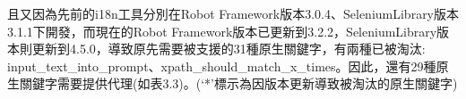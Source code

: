 \begin{table}[H]
    \centering
    \caption{第一版i18n已提供代理的Robot Framework原生關鍵字}
\end{table}

且又因為先前的i18n工具分別在Robot Framework版本3.0.4、SeleniumLibrary版本3.1.1下開發，而現在的Robot Framework版本已更新到3.2.2，SeleniumLibrary版本則更新到4.5.0，導致原先需要被支援的31種原生關鍵字，有兩種已被淘汰:
input\_text\_into\_prompt、xpath\_should\_match\_x\_times。因此，還有29種原生關鍵字需要提供代理(如表3.3)。(‘*’標示為因版本更新導致被淘汰的原生關鍵字)

